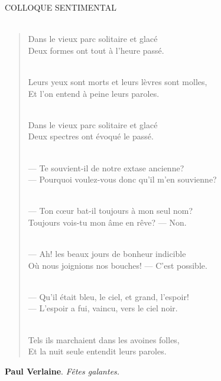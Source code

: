 \newpage

\hspace*{25mm} \hspace*{20mm} COLLOQUE SENTIMENTAL \\ \\

\begin{verse}
\hspace*{25mm} Dans le vieux parc solitaire et glac\'e \\
\hspace*{25mm} Deux formes ont tout \`a l'heure pass\'e. \\ \

\hspace*{25mm} Leurs yeux sont morts et leurs l\`evres sont molles, \\
\hspace*{25mm} Et l'on entend \`a peine leurs paroles. \\ \

\hspace*{25mm} Dans le vieux parc solitaire et glac\'e \\
\hspace*{25mm} Deux spectres ont \'evoqu\'e le pass\'e. \\ \

\hspace*{25mm} --- Te souvient-il de notre extase ancienne? \\
\hspace*{25mm} --- Pourquoi voulez-vous donc qu'il m'en souvienne? \\ \

\hspace*{25mm} --- Ton c{\oe}ur bat-il toujours \`a mon seul nom? \\
\hspace*{25mm} Toujours vois-tu mon \^ame en r\^eve? --- Non. \\ \

\hspace*{25mm} --- Ah! les beaux jours de bonheur indicible \\
\hspace*{25mm} O\`u nous joignions nos bouches! --- C'est possible. \\ \

\hspace*{25mm} --- Qu'il \'etait bleu, le ciel, et grand, l'espoir! \\
\hspace*{25mm} --- L'espoir a fui, vaincu, vers le ciel noir. \\ \

\hspace*{25mm} Tels ils marchaient dans les avoines folles, \\
\hspace*{25mm} Et la nuit seule entendit leurs paroles. \\
\end{verse}

\bigskip \bigskip

\hspace*{25mm} {\bf Paul Verlaine}. {\em F\^etes galantes.}
